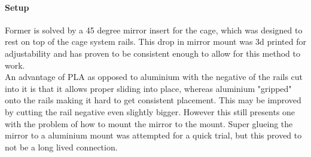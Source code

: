 \documentclass[twoside,openright]{scrreprt}
\begin{document}
\paragraph{Setup}
Former is solved by a 45 degree mirror insert for the cage, which was designed to rest on top of the cage system rails. This drop in mirror mount was 3d printed for adjustability and has proven to be consistent enough to allow for this method to work. \\
An advantage of PLA as opposed to aluminium with the negative of the rails cut into it is that it allows proper sliding into place, whereas aluminium "gripped" onto the rails making it hard to get consistent placement. This may be improved by cutting the rail negative even slightly bigger. However this still presents one with the problem of how to mount the mirror to the mount. Super glueing  the mirror to a aluminium mount was attempted for a quick trial, but this proved to not be a long lived connection.\\
\end{document}
